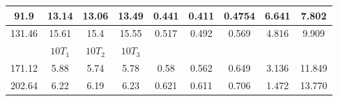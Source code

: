 \documentclass[a4paper, 10pt]{article}
\begin{document}
\begin{justify}
\begin{table}[!h]
\begin{tabular}{|c|c|c|c|c|c|c|c|c|}
        91.9      & 13.14 & 13.06 & 13.49 & 0.441      & 0.411 & 0.4754 & 6.641 & 7.802  \\ 
        \hline
        131.46    & 15.61 & 15.4  & 15.55 & 0.517 & 0.492 & 0.569 & 4.816 & 9.909  \\ 
        \hline
                  & $10 T_1$  & $10 T_2$  & $10 T_3$  &            &             &             &          &           \\ 
        \hline
        171.12    & 5.88  & 5.74  & 5.78  & 0.58       & 0.562 & 0.649 & 3.136 & 11.849  \\ 
        \hline
        202.64    & 6.22  & 6.19  & 6.23  & 0.621     & 0.611  & 0.706   & 1.472
        & 13.770   \\
        \hline
    \end{tabular}
\end{table}
\newpage

\end{justify}
\end{document}
